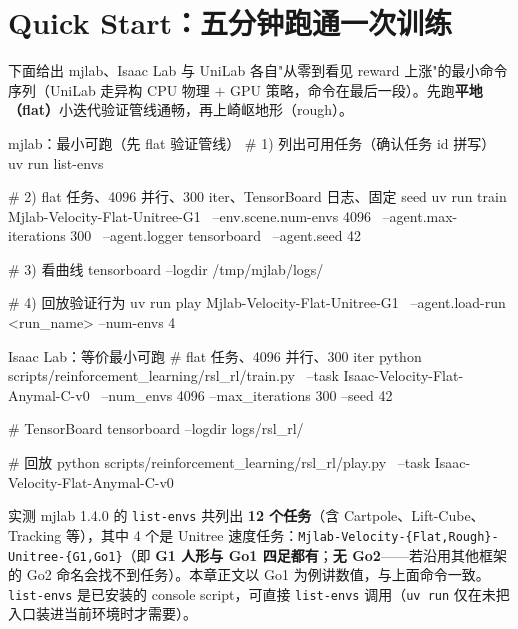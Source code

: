 \section*{Quick Start：五分钟跑通一次训练}
\label{sec:rlmc-train-quickstart}

下面给出 mjlab、Isaac Lab 与 UniLab 各自"从零到看见 reward 上涨"的最小命令序列（UniLab 走异构 CPU 物理 $+$ GPU 策略，命令在最后一段）。先跑\textbf{平地（flat）}小迭代验证管线通畅，再上崎岖地形（rough）。

\begin{codebox}[bash]{mjlab：最小可跑（先 flat 验证管线）}
# 1) 列出可用任务（确认任务 id 拼写）
uv run list-envs

# 2) flat 任务、4096 并行、300 iter、TensorBoard 日志、固定 seed
uv run train Mjlab-Velocity-Flat-Unitree-G1 \
  --env.scene.num-envs 4096 \
  --agent.max-iterations 300 \
  --agent.logger tensorboard \
  --agent.seed 42

# 3) 看曲线
tensorboard --logdir /tmp/mjlab/logs/

# 4) 回放验证行为
uv run play Mjlab-Velocity-Flat-Unitree-G1 \
  --agent.load-run <run_name> --num-envs 4
\end{codebox}

\begin{codebox}[bash]{Isaac Lab：等价最小可跑}
# flat 任务、4096 并行、300 iter
python scripts/reinforcement_learning/rsl_rl/train.py \
  --task Isaac-Velocity-Flat-Anymal-C-v0 \
  --num_envs 4096 --max_iterations 300 --seed 42

# TensorBoard
tensorboard --logdir logs/rsl_rl/

# 回放
python scripts/reinforcement_learning/rsl_rl/play.py \
  --task Isaac-Velocity-Flat-Anymal-C-v0
\end{codebox}

\begin{note}
实测 mjlab 1.4.0 的 \verb|list-envs| 共列出 \textbf{12 个任务}（含 Cartpole、Lift-Cube、Tracking 等），其中 4 个是 Unitree 速度任务：\verb|Mjlab-Velocity-{Flat,Rough}-Unitree-{G1,Go1}|（即 \textbf{G1 人形与 Go1 四足都有}；\textbf{无 Go2}——若沿用其他框架的 Go2 命名会找不到任务）。本章正文以 Go1 为例讲数值，与上面命令一致。\verb|list-envs| 是已安装的 console script，可直接 \verb|list-envs| 调用（\verb|uv run| 仅在未把入口装进当前环境时才需要）。
\end{note}

